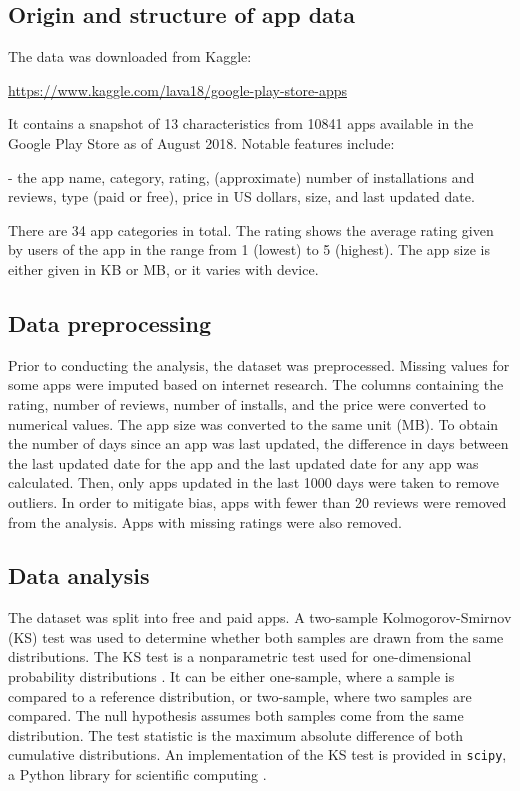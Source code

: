 \documentclass{article}
\begin{document}
\subsection{Origin and structure of app data}

The data was downloaded from Kaggle:
\begin{center}
    \url{https://www.kaggle.com/lava18/google-play-store-apps}
\end{center} It contains a snapshot of 13 characteristics from 10841 apps available in the Google Play Store as of August 2018. Notable features include:

- the app name, category, rating, (approximate) number of installations and reviews, type (paid or free), price in US dollars, size, and last updated date.

There are 34 app categories in total. The rating shows the average rating given by users of the app in the range from 1 (lowest) to 5 (highest). The app size is either given in KB or MB, or it varies with device.

\subsection{Data preprocessing}

Prior to conducting the analysis, the dataset was preprocessed. Missing values for some apps were imputed based on internet research. The columns containing the rating, number of reviews, number of installs, and the price were converted to numerical values. The app size was converted to the same unit (MB). To obtain the number of days since an app was last updated, the difference in days between the last updated date for the app and the last updated date for any app was calculated. Then, only apps updated in the last 1000 days were taken to remove outliers. In order to mitigate bias, apps with fewer than 20 reviews were removed from the analysis. Apps with missing ratings were also removed.

\subsection{Data analysis}

The dataset was split into free and paid apps. A two-sample Kolmogorov-Smirnov (KS) test was used to determine whether both samples are drawn from the same distributions. The KS test is a nonparametric test used for one-dimensional probability distributions \cite{kstest}. It can be either one-sample, where a sample is compared to a reference distribution, or two-sample, where two samples are compared. The null hypothesis assumes both samples come from the same distribution. The test statistic is the maximum absolute difference of both cumulative distributions. An implementation of the KS test is provided in \verb+scipy+, a Python library for scientific computing \cite{scipy}.
\end{document}
